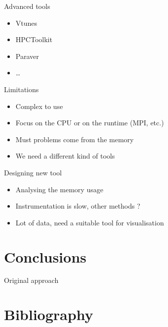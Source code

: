 \documentclass[xcolor={usenames,dvipsnames}]{beamer}
\newcommand{\sectiontitle}{}
\newcommand{\newsection}[1]{\renewcommand{\sectiontitle}{#1}\section{#1}}
\newcommand{\newHsection}[1]{\renewcommand{\sectiontitle}{#1}\section*{#1}}
\begin{document}
\begin{frame}{Advanced tools}
    \begin{itemize}
        \item Vtunes \cite{Reinders05VTune}
        \item HPCToolkit \cite{DeRose01Hardware}
        \item Paraver \cite{Pillet95PARAVER}
        \item \dots
    \end{itemize}
    \pause
    \begin{alertblock}{Limitations}
        \begin{itemize}
            \item Complex to use
            \item  Focus on the CPU or on the runtime (MPI, etc.)
            \item Must problems come from the memory
            \item We need a different kind of tools
        \end{itemize}
    \end{alertblock}
\end{frame}

\begin{frame}{Designing new tool}
    \begin{itemize}[<+->]
        \item Analysing the memory usage\cite{Beniamine13Cartographier}
        \item Instrumentation is slow, other methods ? \cite{Lachaize12MemProf}
        \item Lot of data, need a suitable tool for visualisation
    \end{itemize}
\end{frame}

\newsection{Conclusions}

\setcounter{finalframe}{\value{framenumber}}

\begin{frame}{Original approach}
\end{frame}




\newHsection{Bibliography}
%



\end{document}
